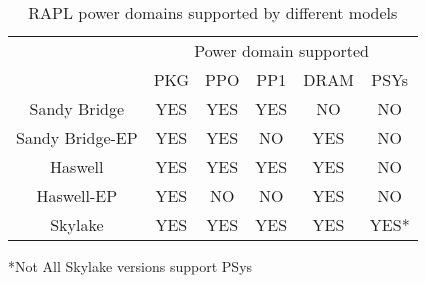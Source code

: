 \begin{table}[H]
\centering
\caption{RAPL power domains supported by different models}
\begin{tabular}{|c|c|c|c|c|c|}
\hline
\multirow{ }{Model }{} & \multicolumn{5}{c|}{Power domain supported} \\ \cline{2-6} 
                       & PKG    & PPO    & PP1    & DRAM    & PSYs   \\ \hline
Sandy Bridge           & YES    & YES    & YES    & NO      & NO     \\
Sandy Bridge-EP        & YES    & YES    & NO     & YES     & NO     \\
Haswell                & YES    & YES    & YES    & YES     & NO     \\
Haswell-EP             & YES    & NO     & NO     & YES     & NO     \\
Skylake                & YES    & YES    & YES    & YES     & YES*   \\ \hline
\end{tabular}
\label{tab:rapltable}
\newline
*Not All Skylake versions support PSys

\end{table}